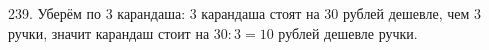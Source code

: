 239. Уберём по 3 карандаша: 3 карандаша стоят на 30 рублей дешевле, чем 3 ручки, значит карандаш стоит на $30:3=10$ рублей дешевле ручки.\\

